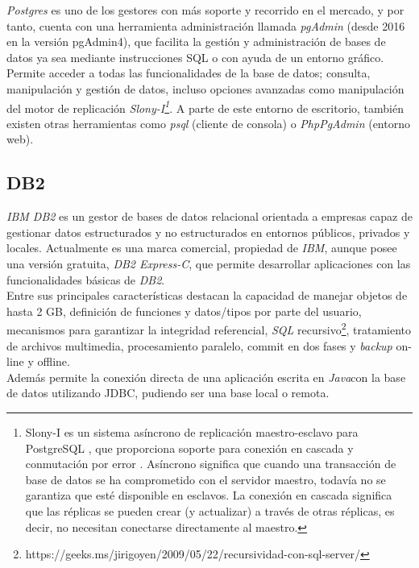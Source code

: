 \documentclass[10pt]{article}
\begin{document}
\emph{Postgres} es uno de los gestores con más soporte y recorrido en el mercado, y por tanto, cuenta con una herramienta administración llamada \emph{pgAdmin} (desde 2016 en la versión pgAdmin4), que facilita la gestión y administración de bases de datos ya sea mediante instrucciones SQL o con ayuda de un entorno gráfico. Permite acceder a todas las funcionalidades de la base de datos; consulta, manipulación y gestión de datos, incluso opciones avanzadas como manipulación del motor de replicación \emph{Slony-I\footnote {Slony-I es un sistema asíncrono de replicación maestro-esclavo para PostgreSQL , que proporciona soporte para conexión en cascada y conmutación por error . Asíncrono significa que cuando una transacción de base de datos se ha comprometido con el servidor maestro, todavía no se garantiza que esté disponible en esclavos. La conexión en cascada significa que las réplicas se pueden crear (y actualizar) a través de otras réplicas, es decir, no necesitan conectarse directamente al maestro.\cite{SLO:1}}}. A parte de este entorno de escritorio, también existen otras herramientas como \emph{psql} (cliente de consola) o \emph{PhpPgAdmin} (entorno web).\cite{PG:1}

\subsection{DB2}

\emph{IBM DB2} es un gestor de bases de datos relacional orientada a empresas capaz de gestionar datos estructurados y no estructurados en entornos públicos, privados y locales.\cite{DB2:1} Actualmente es una marca comercial, propiedad de \emph{IBM}, aunque posee una versión gratuita, \emph{DB2 Express-C}\cite{DB2:2}, que permite desarrollar aplicaciones con las funcionalidades básicas de \emph{DB2}.\\

Entre sus principales características destacan la capacidad de manejar objetos de hasta 2 GB, definición de funciones y datos/tipos por parte del usuario, mecanismos para garantizar la integridad referencial, \emph{SQL} recursivo\footnote{https://geeks.ms/jirigoyen/2009/05/22/recursividad-con-sql-server/}, tratamiento de archivos multimedia, procesamiento paralelo, commit en dos fases y \emph{backup} on-line y offline.\\
Además permite la conexión directa de una aplicación escrita en \emph{Java}con la base de datos utilizando JDBC,  pudiendo ser una base local o remota.\cite{DB2:3}\\
\end{document}
